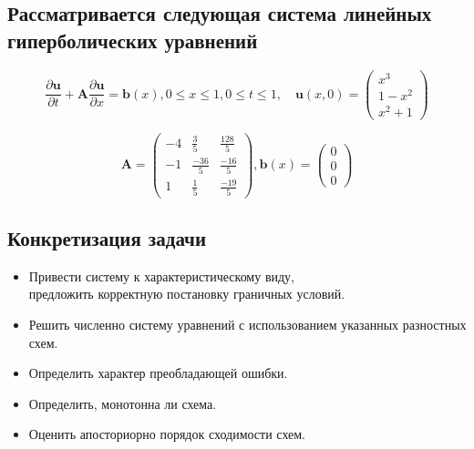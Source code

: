 \documentclass[a4paper,14pt]{article}
\begin{document}
    \subsection{Рассматривается следующая система линейных\\ гиперболических уравнений} 
    \begin{equation}
    \frac{\partial \mathbf{u}}{\partial t}+\mathbf{A} \frac{\partial \mathbf{u}}{\partial x}=\mathbf{b}(x), 0 \leqslant x \leqslant 1,0 \leqslant t \leqslant 1, \quad \mathbf{u}(x, 0)=\left( \begin{array}{c}{x^{3}} \\ {1-x^{2}} \\ {x^{2}+1}\end{array}\right)
\end{equation}
    
    \vspace{0.5cm}
    \begin{equation}
\mathbf{A}=\left( \begin{array}{ccc}{-4} & {\frac{3}{5}} & {\frac{128}{5}} \\ {-1} & {\frac{-36}{5}} & {\frac{-16}{5}} \\ {1} & {\frac{1}{5}} & {\frac{-19}{5}}\end{array}\right), \mathbf{b}(x)=\left( \begin{array}{l}{0} \\ {0} \\ {0}\end{array}\right)
\end{equation}
    
    \newpage
    \subsection{Конкретизация задачи}
    \begin{itemize}
    \item Привести систему к характеристическому виду,\\ предложить корректную постановку граничных условий.
    \item Решить численно систему уравнений с использованием указанных разностных схем.
    \item Определить характер преобладающей ошибки.
    \item Определить, монотонна ли схема.
    \item Оценить апосториорно порядок сходимости схем.
    \end{itemize}
    \vspace{1cm}
\end{document}
